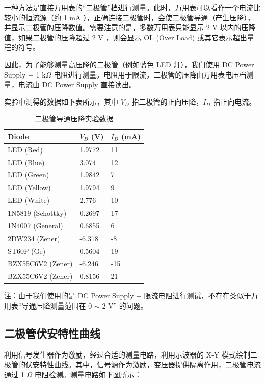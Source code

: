 \documentclass[UTF8]{article}
\begin{document}
一种方法是直接万用表的“二极管”档进行测量。此时，万用表可以看作一个电流比较小的恒流源（约 1 mA ），正确连接二极管时，会使二极管导通（产生压降），并显示二极管的压降数值。需要注意的是，多数万用表只能显示 2 V 以内的压降值，如果二极管的压降超过 2 V ，则会显示 OL (Over Load) 或其它表示超出量程的符号。

因此，为了能够测量高压降的二极管（例如蓝色 LED 灯），我们使用 DC Power Supply + 1 k$\Omega$ 电阻进行测量。电阻用于限流，二极管的压降由万用表电压档测量，电流由 DC Power Supply 直接读出。

实验中测得的数据如下表所示，其中 $V_D$ 指二极管的正向压降，$I_D$ 指正向电流。

\begin{table}[H]\centering
    \caption{二极管导通压降实验数据}
    \label{二极管导通压降实验数据}
\begin{tabular}{lll}\toprule
    Diode & $V_D$ (V) & $I_D$ (mA) \\
    \midrule
    LED (Red)           & 1.9772 & 11 \\
    LED (Blue)          & 3.074  & 12 \\
    LED (Green)         & 1.9842 & 7 \\
    LED (Yellow)        & 1.9794 & 9 \\
    LED (White)         & 2.776  & 10 \\
    1N5819 (Schottky)   & 0.2697 & 17 \\
    1N4007 (General)    & 0.6855 & 6 \\
    2DW234 (Zener)      & -6.318  & -8 \\
    ST60P (Ge)          & 0.5604 & 19 \\
    BZX55C6V2 (Zener)   & -6.246  & -15 \\
    BZX55C6V2 (Zener)   & 0.8156 & 21 \\
    \bottomrule
\end{tabular}
\end{table}

\noindent 注：由于我们使用的是 DC Power Supply + 限流电阻进行测试，不存在类似于万用表“导通压降测量范围在 0 $\sim$ 2 V” 的问题。

\subsection{二极管伏安特性曲线}

利用信号发生器作为激励，经过合适的测量电路，利用示波器的 X-Y 模式绘制二极管的伏安特性曲线。其中，信号源作为激励，变压器提供隔离作用，二极管电流通过 1 $\Omega$ 电阻检测。测量电路如下图所示：
\end{document}

